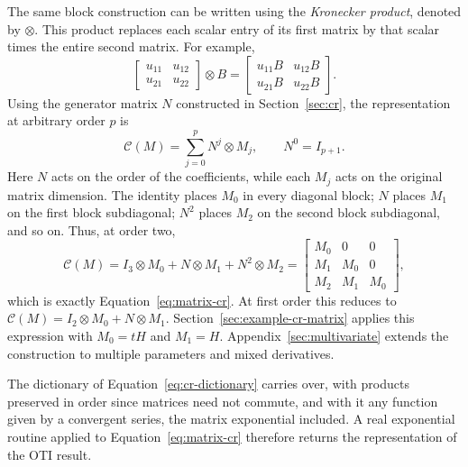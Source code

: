 \documentclass[10pt]{article}
\begin{document}
The same block construction can be written using the \emph{Kronecker product},
denoted by $\otimes$. This product replaces each scalar entry of its first
matrix by that scalar times the entire second matrix. For example,
\[
 \begin{bmatrix}u_{11}&u_{12}\\u_{21}&u_{22}\end{bmatrix}\otimes B
 =\begin{bmatrix}u_{11}B&u_{12}B\\u_{21}B&u_{22}B\end{bmatrix}.
\]
Using the generator matrix $N$ constructed in Section~\ref{sec:cr}, the
representation at arbitrary order $p$ is
\begin{equation}
\label{eq:matrix-cr-kronecker}
 \boxed{\mathcal C(M)=\sum_{j=0}^{p}N^j\otimes M_j},\qquad
 N^0=I_{p+1}.
\end{equation}
Here $N$ acts on the order of the coefficients, while each $M_j$ acts on the
original matrix dimension. The identity places $M_0$ in every diagonal block;
$N$ places $M_1$ on the first block subdiagonal; $N^2$ places $M_2$ on the
second block subdiagonal, and so on. Thus, at order two,
\[
 \mathcal C(M)=I_3\otimes M_0+N\otimes M_1+N^2\otimes M_2
 =\begin{bmatrix}M_0&0&0\\M_1&M_0&0\\M_2&M_1&M_0\end{bmatrix},
\]
which is exactly Equation~\eqref{eq:matrix-cr}. At first order this reduces to
$\mathcal C(M)=I_2\otimes M_0+N\otimes M_1$.
Section~\ref{sec:example-cr-matrix} applies this expression with $M_0=tH$
and $M_1=H$. Appendix~\ref{sec:multivariate} extends the construction to
multiple parameters and mixed derivatives.

The dictionary of Equation~\eqref{eq:cr-dictionary} carries over, with products
preserved in order since matrices need not commute, and with it any function
given by a convergent series, the matrix exponential included. A real
exponential routine applied to Equation~\eqref{eq:matrix-cr} therefore returns
the representation of the OTI result.
\end{document}

